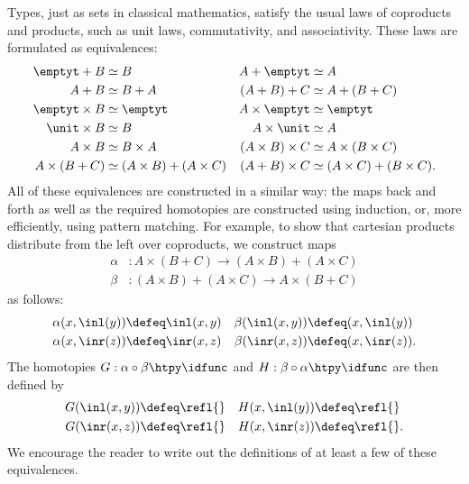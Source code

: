 \begin{eg}\label{eg:laws-products-coproducts}
  Types, just as sets in classical mathematics, satisfy the usual laws of coproducts and products, such as unit laws, commutativity, and associativity. These laws are formulated as equivalences:
  \begin{align*}
    \emptyt+B & \simeq B & A+\emptyt & \simeq A \\
    A+B & \simeq B+A & (A+B)+C & \simeq A+(B+C) \\
    \emptyt\times B & \simeq \emptyt & A\times\emptyt & \simeq \emptyt\\
    \unit\times B & \simeq B & A\times\unit & \simeq A \\
    A\times B & \simeq B\times A & (A \times B) \times C & \simeq A \times (B \times C) \\
    A\times (B+C) & \simeq (A\times B)+(A\times C) & (A+B)\times C & \simeq (A\times C)+(B\times C).
  \end{align*}
  All of these equivalences are constructed in a similar way: the maps back and forth as well as the required homotopies are constructed using induction, or, more efficiently, using pattern matching. For example, to show that cartesian products distribute from the left over coproducts, we construct maps
  \begin{align*}
    \alpha & : A\times(B+C)\to (A\times B)+(A\times C) \\
    \beta & : (A\times B)+(A\times C)\to A\times(B+C)
  \end{align*}
  as follows:
  \begin{align*}
    \alpha(x,\inl(y)) & \defeq \inl(x,y) & \beta(\inl(x,y)) & \defeq (x,\inl(y)) \\
    \alpha(x,\inr(z)) & \defeq \inr(x,z) & \beta(\inr(x,z)) & \defeq (x,\inr(z)).
  \end{align*}
  The homotopies $G:\alpha\circ\beta\htpy\idfunc$ and $H:\beta\circ\alpha\htpy \idfunc$ are then defined by
  \begin{align*}
    G(\inl(x,y)) & \defeq \refl{} & H(x,\inl(y)) & \defeq \refl{} \\
    G(\inr(x,z)) & \defeq \refl{} & H(x,\inr(z)) & \defeq \refl{}.
  \end{align*}
  We encourage the reader to write out the definitions of at least a few of these equivalences.
\end{eg}

